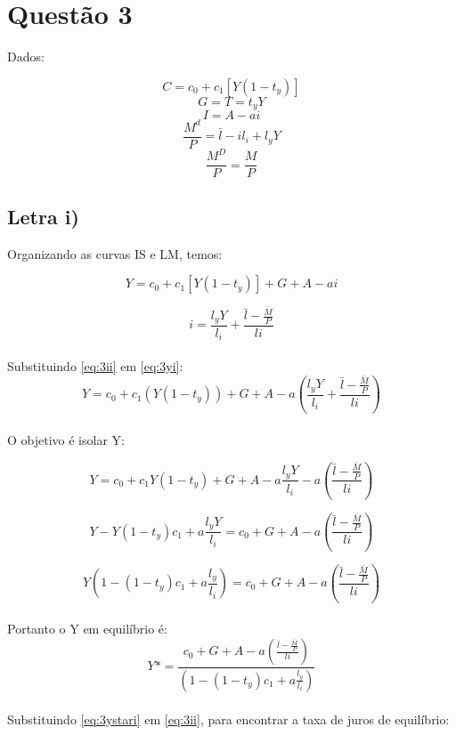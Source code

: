 \documentclass{article}
\begin{document}
\section*{Questão 3}
Dados:

$$ C = c_0 + c_1[Y(1-t_y)]$$
$$G=T=t_y Y$$
$$I = A -ai$$
$$\frac{M^{d}}{P} = \bar{l} - il_i + l_y Y$$
$$\frac{M^D}{P}=\frac{M}{P}$$

\subsection*{Letra i)}
Organizando as curvas IS e LM, temos:

\begin{equation}\label{eq:3yi}
Y = c_0 + c_1[Y(1-t_y)] + G + A -ai 
\end{equation}

\begin{equation}\label{eq:3ii}
i = \frac{l_y Y}{l_i} + \frac{\bar{l} - \frac{\bar{M}}{P}}{li}
\end{equation}
\\
Substituindo \eqref{eq:3ii} em \eqref{eq:3yi}:
\begin{equation}
Y = c_0 + c_1(Y(1-t_y)) + G + A -a(\frac{l_y Y}{l_i} + \frac{\bar{l} - \frac{\bar{M}}{P}}{li})
\end{equation}
\\
O objetivo é isolar Y:

\begin{equation}
Y = c_0 + c_1 Y(1-t_y) + G + A -a\frac{l_y Y}{l_i} -a( \frac{\bar{l} - \frac{\bar{M}}{P}}{li})
\end{equation}

\begin{equation}
Y - Y(1-t_y)c_1 + a\frac{l_y Y}{l_i} = c_0 + G + A -a( \frac{\bar{l} - \frac{\bar{M}}{P}}{li})
\end{equation}

\begin{equation}
Y(1 - (1-t_y)c_1 + a\frac{l_y }{l_i}) = c_0+ G + A -a( \frac{\bar{l} - \frac{\bar{M}}{P}}{li})
\end{equation}
\\
Portanto o Y em equilíbrio é:
\begin{equation}\label{eq:3ystari}
Y* =\frac{ c_0 + G + A -a( \frac{\bar{l} - \frac{\bar{M}}{P}}{li})}{(1 - (1-t_y)c_1 + a\frac{l_y }{l_i})}
\end{equation}
\\
Substituindo \eqref{eq:3ystari} em \eqref{eq:3ii}, para encontrar a taxa de juros de equilíbrio:
\end{document}
